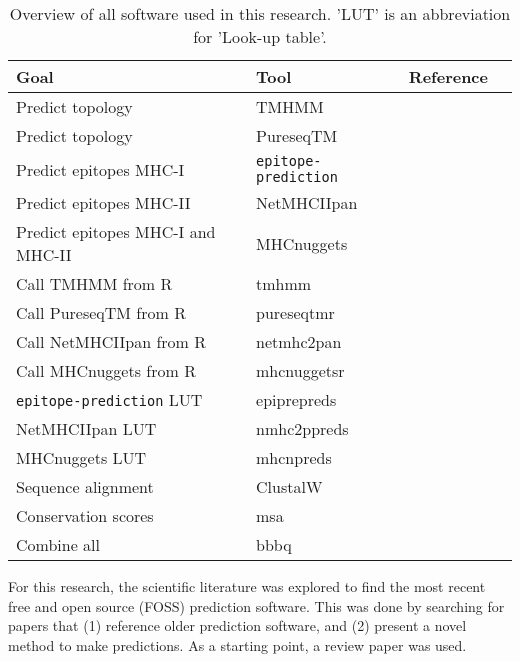 \begin{table}[]
  \begin{tabular}{llll}
    Goal & Tool & Reference \\ 
    \hline
    Predict topology                  & TMHMM                     & \cite{krogh2001predicting} \\
    Predict topology                  & PureseqTM                 & \cite{wang2019efficient} \\
    Predict epitopes MHC-I            & \verb;epitope-prediction; & \cite{bianchi2017} \\
    Predict epitopes MHC-II           & NetMHCIIpan               & \cite{nielsen2008quantitative,karosiene2013netmhciipan} \\
    Predict epitopes MHC-I and MHC-II & MHCnuggets                & \cite{shao2020high} \\
    Call TMHMM from R                 & tmhmm                     & \cite{tmhmm} \\
    Call PureseqTM from R             & pureseqtmr                & \cite{pureseqtmr} \\
    Call NetMHCIIpan from R           & netmhc2pan                & \cite{netmhc2pan} \\
    Call MHCnuggets from R            & mhcnuggetsr               & \cite{mhcnuggetsr} \\
    \verb;epitope-prediction; LUT     & epiprepreds               & \cite{epiprepreds} \\
    NetMHCIIpan LUT                   & nmhc2ppreds               & \cite{nmhc2ppreds} \\
    MHCnuggets LUT                    & mhcnpreds                 & \cite{mhcnpreds} \\
    Sequence alignment                & ClustalW                  & \cite{thompson1994clustal} \\
    Conservation scores               & msa                       & \cite{bodenhofer2015msa} \\
    Combine all                       & bbbq                      & \cite{bbbq}
  \end{tabular}
  \caption{
    Overview of all software used in this research.
    'LUT' is an abbreviation for 'Look-up table'. 
  }
  \label{table:software_used}
\end{table}

For this research, the scientific literature was explored 
to find the most recent free and open source (FOSS) prediction software.
This was done by searching for papers that (1) reference older
prediction software, and (2) present a novel method to make predictions.
As a starting point, a review paper was used.

